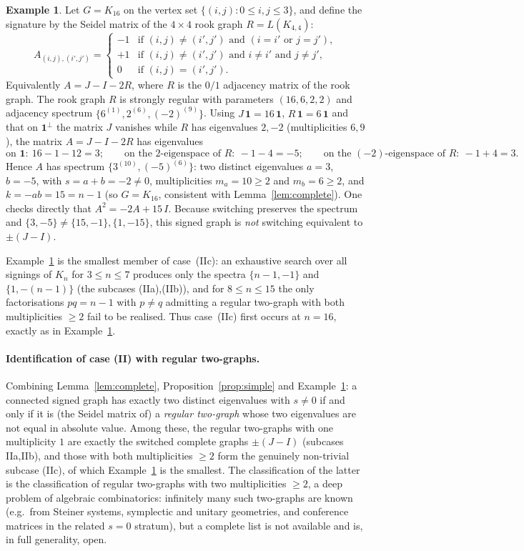 \documentclass{amsart}
\theoremstyle{definition}
\newtheorem{example}{Example}
\begin{document}
\begin{example}\label{ex:rook}
Let $G=K_{16}$ on the vertex set $\{(i,j):0\le i,j\le3\}$, and define the
signature by the Seidel matrix of the $4\times4$ rook graph $R=L(K_{4,4})$:
\[
A_{(i,j),(i',j')}=
\begin{cases}
-1 & \text{if }(i,j)\ne(i',j')\text{ and }(i=i'\text{ or }j=j'),\\
+1 & \text{if }(i,j)\ne(i',j')\text{ and }i\ne i'\text{ and }j\ne j',\\
0 & \text{if }(i,j)=(i',j').
\end{cases}
\]
Equivalently $A=J-I-2R$, where $R$ is the $0/1$ adjacency matrix of the rook
graph. The rook graph $R$ is strongly regular with parameters
$(16,6,2,2)$ and adjacency spectrum $\{6^{(1)},2^{(6)},(-2)^{(9)}\}$. Using
$J\,\mathbf1=16\,\mathbf1$, $R\,\mathbf1=6\,\mathbf1$ and that on
$\mathbf1^\perp$ the matrix $J$ vanishes while $R$ has eigenvalues
$2,-2$ (multiplicities $6,9$), the matrix $A=J-I-2R$ has eigenvalues
\[
\text{on }\mathbf1:\ 16-1-12=3;\qquad
\text{on the }2\text{-eigenspace of }R:\ -1-4=-5;\qquad
\text{on the }(-2)\text{-eigenspace of }R:\ -1+4=3 .
\]
Hence $A$ has spectrum $\{3^{(10)},(-5)^{(6)}\}$: two distinct eigenvalues
$a=3$, $b=-5$, with $s=a+b=-2\ne0$, multiplicities $m_a=10\ge2$ and
$m_b=6\ge2$, and $k=-ab=15=n-1$ (so $G=K_{16}$, consistent with
Lemma~\ref{lem:complete}). One checks directly that $A^2=-2A+15\,I$. Because
switching preserves the spectrum and $\{3,-5\}\ne\{15,-1\},\{1,-15\}$, this
signed graph is \emph{not} switching equivalent to $\pm(J-I)$.
\end{example}

Example~\ref{ex:rook} is the smallest member of case~(IIc): an exhaustive
search over all signings of $K_n$ for $3\le n\le7$ produces only the spectra
$\{n-1,-1\}$ and $\{1,-(n-1)\}$ (the subcases (IIa),(IIb)), and for
$8\le n\le15$ the only factorisations $pq=n-1$ with $p\ne q$ admitting a
regular two-graph with both multiplicities $\ge2$ fail to be realised. Thus
case~(IIc) first occurs at $n=16$, exactly as in Example~\ref{ex:rook}.

\paragraph{Identification of case (II) with regular two-graphs.}
Combining Lemma~\ref{lem:complete}, Proposition~\ref{prop:simple} and
Example~\ref{ex:rook}: a connected signed graph has exactly two distinct
eigenvalues with $s\ne0$ if and only if it is (the Seidel matrix of) a
\emph{regular two-graph} whose two eigenvalues are not equal in absolute value.
Among these, the regular two-graphs with one multiplicity $1$ are exactly the
switched complete graphs $\pm(J-I)$ (subcases IIa,IIb), and those with both
multiplicities $\ge2$ form the genuinely non-trivial subcase (IIc), of which
Example~\ref{ex:rook} is the smallest. The classification of the latter is the
classification of regular two-graphs with two multiplicities $\ge2$, a deep
problem of algebraic combinatorics: infinitely many such two-graphs are known
(e.g.\ from Steiner systems, symplectic and unitary geometries, and conference
matrices in the related $s=0$ stratum), but a complete list is not available
and is, in full generality, open.
\end{document}
